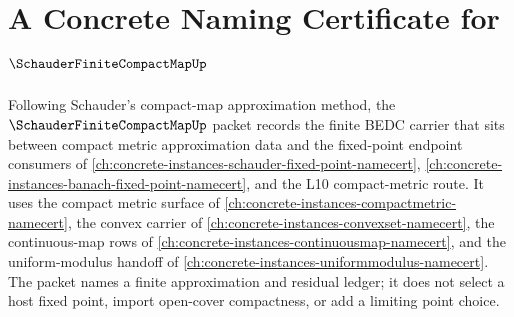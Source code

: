 \chapter{A Concrete Naming Certificate for $\SchauderFiniteCompactMapUp$}
\label{ch:concrete-instances-schauder-finite-compact-map-namecert}

Following Schauder's compact-map approximation method, the $\SchauderFiniteCompactMapUp$ packet records the finite BEDC carrier that sits between compact metric approximation data and the fixed-point endpoint consumers of \autoref{ch:concrete-instances-schauder-fixed-point-namecert}, \autoref{ch:concrete-instances-banach-fixed-point-namecert}, and the L10 compact-metric route. It uses the compact metric surface of \autoref{ch:concrete-instances-compactmetric-namecert}, the convex carrier of \autoref{ch:concrete-instances-convexset-namecert}, the continuous-map rows of \autoref{ch:concrete-instances-continuousmap-namecert}, and the uniform-modulus handoff of \autoref{ch:concrete-instances-uniformmodulus-namecert}. The packet names a finite approximation and residual ledger; it does not select a host fixed point, import open-cover compactness, or add a limiting point choice.

